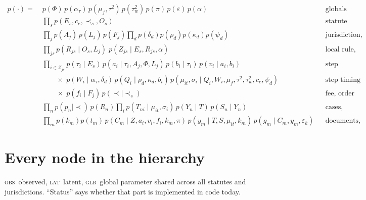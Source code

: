 \documentclass[11pt]{article}
\newcommand{\obsmark}{\textsc{obs}}
\newcommand{\latmark}{\textsc{lat}}
\newcommand{\glbmark}{\textsc{glb}}
\begin{document}
\begin{align*}
p(\cdot) =\;&
 p(\Phi)\,p(\alpha_\tau)\,p(\mu_f,\tau^2)\,p(\tau^2_w)\,p(\pi)\,p(\varepsilon)\,p(\alpha)
 && \text{globals}\\[2pt]
 &\textstyle\prod_s p(E_s,c_e,\prec_s,O_s) && \text{statute (observed)}\\[2pt]
 &\textstyle\prod_j p(A_j)\,p(L_j)\,p(F_j)\prod_d p(\delta_d)p(\rho_d)p(\kappa_d)p(\psi_d)
 && \text{jurisdiction, departments}\\[2pt]
 &\textstyle\prod_{js} p(R_{js}\mid O_s,L_j)\;p(Z_{js}\mid E_s,R_{js},\alpha)
 && \text{local rule, which steps exist}\\[2pt]
 &\textstyle\prod_{i\in Z_{js}} p(\tau_i\mid E_s)\,p(a_i\mid \tau_i,A_j,\Phi,L_j)\,p(b_i\mid\tau_i)\,
   p(v_i\mid a_i,b_i) && \text{step identity}\\
 &\qquad \times\; p(W_i\mid\alpha_\tau,\delta_d)\,p(Q_i\mid\rho_d,\kappa_d,b_i)\,
   p(\mu_{it},\sigma_i\mid Q_i,W_i,\mu_f,\tau^2,\tau^2_w,c_e,\psi_d) && \text{step timing}\\
 &\qquad \times\; p(f_i\mid F_j)\,p(\prec\mid\prec_s) && \text{fee, order}\\[2pt]
 &\textstyle\prod_n p(p_n\mid\prec)\,p(R_n)\prod_i p(T_{ni}\mid\mu_{it},\sigma_i)\,
   p(Y_n\mid T)\,p(S_n\mid Y_n) && \text{cases, selection}\\[2pt]
 &\textstyle\prod_m p(k_m)p(t_m)\,p(C_m\mid Z,a_i,v_i,f_i,k_m,\pi)\,
   p(y_m\mid T,S,\mu_{it},k_m)\,p(g_m\mid C_m,y_m,\varepsilon_k) && \text{documents, extraction}
\end{align*}

\section{Every node in the hierarchy}

\obsmark\ observed, \latmark\ latent, \glbmark\ global parameter shared across all statutes and
jurisdictions. ``Status'' says whether that part is implemented in code today.
\end{document}
